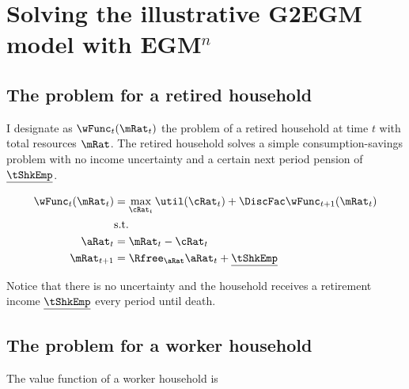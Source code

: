 \documentclass[\econtexRoot/SequentialEGM]{subfiles}
\begin{document}

\hypertarget{Appendices}{} %

\hypertarget{Estimating-discount-factor-distributions-for-different-interest-rates}{}\par\section{Solving the illustrative G2EGM model with EGM$^n$}
\notinsubfile{\label{app:DF_R}}

\subsection{The problem for a retired household}

I designate as $\wFunc_{t}(\mRat_{t})$ the problem of a retired household at time $t$ with total resources $\mRat$. The retired household solves a simple consumption-savings problem with no income uncertainty and a certain next period pension of $\underline{\tShkEmp}$.

\begin{equation}
        \begin{split}
                \wFunc_{t}(\mRat_{t}) & = \max_{\cRat_{t}} \util(\cRat_{t}) +
                \DiscFac \wFunc_{t+1}(\mRat_{t}) \\
                & \text{s.t.} \\
                \aRat_{t} & = \mRat_{t} - \cRat_{t} \\
                \mRat_{t+1} & = \Rfree_{\aRat} \aRat_{t} +
                \underline{\tShkEmp}
        \end{split}
\end{equation}

Notice that there is no uncertainty and the household receives a retirement
income $\underline{\tShkEmp}$ every period until death.

\subsection{The problem for a worker household}

The value function of a worker household is
\end{document}
